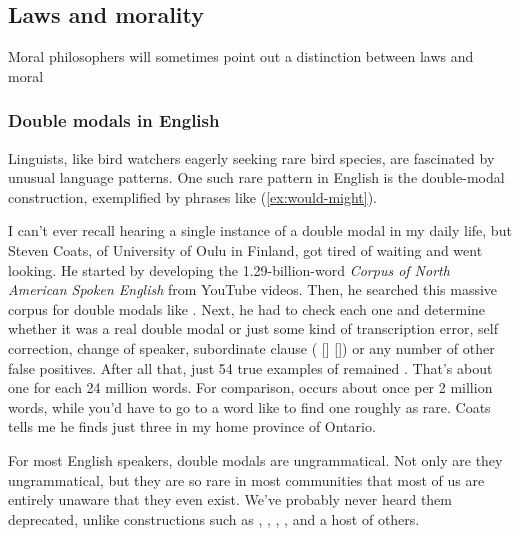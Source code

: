 \subsection{Laws and morality}

Moral philosophers will sometimes point out a distinction between laws and moral

\subsubsection{Double modals in English}

Linguists, like bird watchers eagerly seeking rare bird species, are fascinated by unusual language patterns. One such rare pattern in English is the double-modal construction, exemplified by phrases like (\ref{ex:would-might}).

\label{ex:would-might}
\z

I can't ever recall hearing a single instance of a double modal in my daily life, but Steven Coats, of University of Oulu in Finland, got tired of waiting and went looking. He started by developing the 1.29-billion-word \textit{Corpus of North American Spoken English} \citep{Coats2023} from YouTube videos. Then, he searched this massive corpus for double modals like . Next, he had to check each one and determine whether it was a real double modal or just some kind of transcription error, self correction, change of speaker, subordinate clause ( [] []) or any number of other false positives. After all that, just 54 true examples of  remained \citep{Coats2022}. That's about one for each 24 million words. For comparison,  occurs about once per 2 million words, while you'd have to go to a word like  to find one roughly as rare. Coats tells me he finds just three in my home province of Ontario.

For most English speakers, double modals are ungrammatical. Not only are they ungrammatical, but they are so rare in most communities that most of us are entirely unaware that they even exist. We've probably never heard them deprecated, unlike constructions such as , , , , and a host of others.

